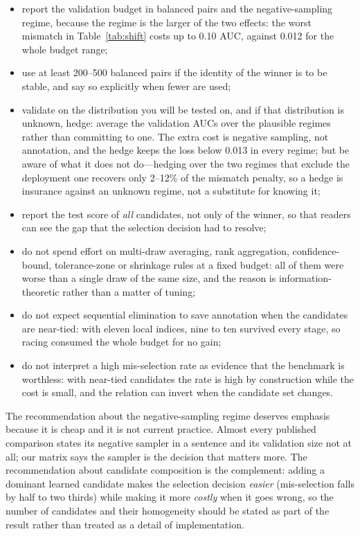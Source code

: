 \documentclass{comjnl}
\begin{document}
\begin{itemize}
\item report the validation budget in balanced pairs and the negative-sampling regime, because the regime is the larger of the two effects: the worst mismatch in Table~\ref{tab:shift} costs up to 0.10 AUC, against 0.012 for the whole budget range;
\item use at least 200--500 balanced pairs if the identity of the winner is to be stable, and say so explicitly when fewer are used;
\item validate on the distribution you will be tested on, and if that distribution is unknown, hedge: average the validation AUCs over the plausible regimes rather than committing to one. The extra cost is negative sampling, not annotation, and the hedge keeps the loss below 0.013 in every regime; but be aware of what it does not do---hedging over the two regimes that exclude the deployment one recovers only 2--12\% of the mismatch penalty, so a hedge is insurance against an unknown regime, not a substitute for knowing it;
\item report the test score of \emph{all} candidates, not only of the winner, so that readers can see the gap that the selection decision had to resolve;
\item do not spend effort on multi-draw averaging, rank aggregation, confidence-bound, tolerance-zone or shrinkage rules at a fixed budget: all of them were worse than a single draw of the same size, and the reason is information-theoretic rather than a matter of tuning;
\item do not expect sequential elimination to save annotation when the candidates are near-tied: with eleven local indices, nine to ten survived every stage, so racing consumed the whole budget for no gain;
\item do not interpret a high mis-selection rate as evidence that the benchmark is worthless: with near-tied candidates the rate is high by construction while the cost is small, and the relation can invert when the candidate set changes.
\end{itemize}

The recommendation about the negative-sampling regime deserves emphasis because it is cheap and it is not current practice. Almost every published comparison states its negative sampler in a sentence and its validation size not at all; our matrix says the sampler is the decision that matters more. The recommendation about candidate composition is the complement: adding a dominant learned candidate makes the selection decision \emph{easier} (mis-selection falls by half to two thirds) while making it more \emph{costly} when it goes wrong, so the number of candidates and their homogeneity should be stated as part of the result rather than treated as a detail of implementation.
\end{document}
